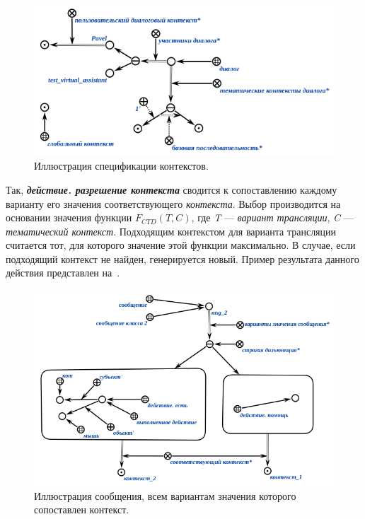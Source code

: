 \begin{figure}[h]
    \centering
    \includegraphics[scale=0.8]{images/part4/chapter_nl_interfaces/user_context}
    \caption{Иллюстрация спецификации контекстов.}
    \label{fig:user_context}
\end{figure}

Так, \textbf{\textit{действие. разрешение контекста}} сводится к сопоставлению каждому варианту его значения соответствующего \textit{контекста}.
Выбор производится на основании значения функции \textit{$F_{CTD}(T, C)$}, где \textit{T} --- \textit{вариант трансляции}, \textit{C} --- \textit{тематический контекст}.
Подходящим контекстом для варианта трансляции считается тот, для которого значение этой функции максимально.
В случае, если подходящий контекст не найден, генерируется новый.
Пример результата данного действия представлен на~\textit{}.

\begin{figure}[h]
    \centering
    \includegraphics[scale=0.8]{images/part4/chapter_nl_interfaces/relevant_contexts}
    \caption{Иллюстрация сообщения, всем вариантам значения которого сопоставлен контекст.}
    \label{fig:relevant_contexts}
\end{figure}

